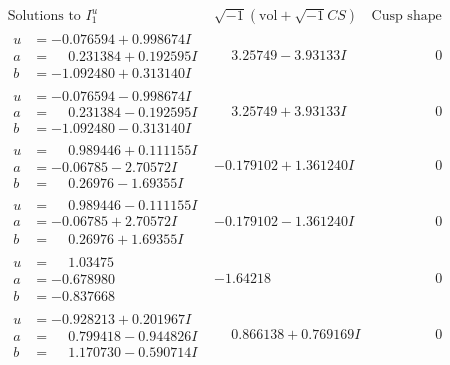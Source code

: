 \documentclass[1p]{elsarticle_modified}
\theoremstyle{definition}
\newcommand{\I}{\sqrt{-1}}
\begin{document}
$$\begin{array}{c|c|c}  
\text{Solutions to }I^u_{1}& \I (\text{vol} + \sqrt{-1}CS) & \text{Cusp shape}\\
 \hline 
\begin{aligned}
u &= -0.076594 + 0.998674 I \\
a &= \phantom{-}0.231384 + 0.192595 I \\
b &= -1.092480 + 0.313140 I\end{aligned}
 & \phantom{-}3.25749 - 3.93133 I & \phantom{-0.000000 } 0 \\ \hline\begin{aligned}
u &= -0.076594 - 0.998674 I \\
a &= \phantom{-}0.231384 - 0.192595 I \\
b &= -1.092480 - 0.313140 I\end{aligned}
 & \phantom{-}3.25749 + 3.93133 I & \phantom{-0.000000 } 0 \\ \hline\begin{aligned}
u &= \phantom{-}0.989446 + 0.111155 I \\
a &= -0.06785 - 2.70572 I \\
b &= \phantom{-}0.26976 - 1.69355 I\end{aligned}
 & -0.179102 + 1.361240 I & \phantom{-0.000000 } 0 \\ \hline\begin{aligned}
u &= \phantom{-}0.989446 - 0.111155 I \\
a &= -0.06785 + 2.70572 I \\
b &= \phantom{-}0.26976 + 1.69355 I\end{aligned}
 & -0.179102 - 1.361240 I & \phantom{-0.000000 } 0 \\ \hline\begin{aligned}
u &= \phantom{-}1.03475\phantom{ +0.000000I} \\
a &= -0.678980\phantom{ +0.000000I} \\
b &= -0.837668\phantom{ +0.000000I}\end{aligned}
 & -1.64218\phantom{ +0.000000I} & \phantom{-0.000000 } 0 \\ \hline\begin{aligned}
u &= -0.928213 + 0.201967 I \\
a &= \phantom{-}0.799418 - 0.944826 I \\
b &= \phantom{-}1.170730 - 0.590714 I\end{aligned}
 & \phantom{-}0.866138 + 0.769169 I & \phantom{-0.000000 } 0 \\ \hline\begin{aligned}

\end{aligned}
\end{array}$$
\end{document}
